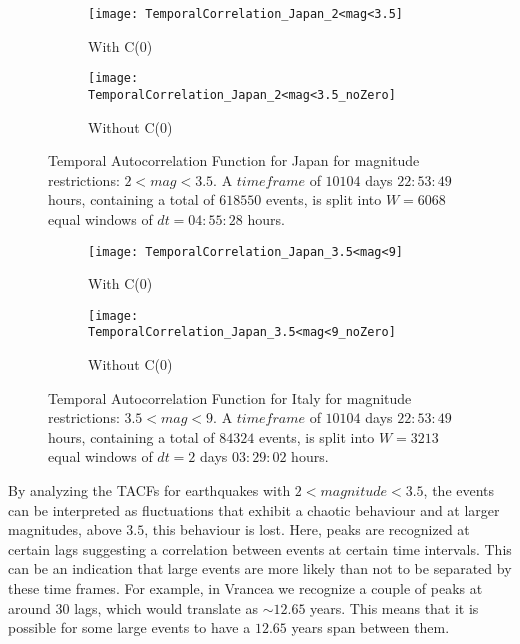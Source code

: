 \begin{figure}[!ht]
\begin{subfigure}{.5\textwidth}
  \centering
  \texttt{[image: TemporalCorrelation\_Japan\_2<mag<3.5]}
  \caption{With C(0)}
  \label{fig:corrJapan2_3.5}
\end{subfigure}%
\begin{subfigure}{.5\textwidth}
  \centering
  \texttt{[image: TemporalCorrelation\_Japan\_2<mag<3.5\_noZero]}
  \caption{Without C(0)}
  \label{fig:corrJapan2_3.5_noZero}
\end{subfigure}
\caption{Temporal Autocorrelation Function for Japan for magnitude restrictions: $2<mag<3.5$. A $timeframe$ of $10104$ days $22:53:49$ hours, containing a total of $618550$ events, is split into $W=6068$ equal windows of $dt=04:55:28$ hours.}
\label{fig:corrJapan2_3.5!}
\end{figure}


\begin{figure}[!ht]
\begin{subfigure}{.5\textwidth}
  \centering
  \texttt{[image: TemporalCorrelation\_Japan\_3.5<mag<9]}
  \caption{With C(0)}
  \label{fig:corrJapan3.5_9}
\end{subfigure}%
\begin{subfigure}{.5\textwidth}
  \centering
  \texttt{[image: TemporalCorrelation\_Japan\_3.5<mag<9\_noZero]}
  \caption{Without C(0)}
  \label{fig:corrJapan3.5_9_noZero}
\end{subfigure}
\caption{Temporal Autocorrelation Function for Italy for magnitude restrictions: $3.5<mag<9$. A $timeframe$ of $10104$ days $22:53:49$ hours, containing a total of $84324$ events, is split into $W=3213$ equal windows of $dt=2$ days $03:29:02$ hours.}
\label{fig:corrJapan3.5_9!}
\end{figure}

By analyzing the TACFs for earthquakes with $2<magnitude<3.5$, the events can be interpreted as fluctuations that exhibit a chaotic behaviour and at larger magnitudes, above $3.5$, this behaviour is lost. Here, peaks are recognized at certain lags suggesting a correlation between events at certain time intervals. This can be an indication that large events are more likely than not to be separated by these time frames. For example, in Vrancea we recognize a couple of peaks at around $30$ lags, which would translate as $\sim 12.65$ years. This means that it is possible for some large events to have a $12.65$ years span between them.\par 
